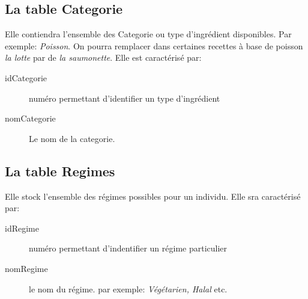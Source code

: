 \subsection{La table Categorie}
Elle contiendra l'ensemble des Categorie ou type d'ingrédient disponibles. Par exemple: \textit{Poisson}. On pourra remplacer dans certaines recettes à base de poisson \textit{la lotte} par de \textit{la saumonette}. Elle est caractérisé par:
\begin{description}
    \item[idCategorie] numéro permettant d'identifier un type d'ingrédient
    \item[nomCategorie] Le nom de la categorie.
\end{description}

\subsection{La table Regimes}
Elle stock l'ensemble des régimes possibles pour un individu. Elle sra caractérisé par:
\begin{description}
    \item[idRegime] numéro permettant d'indentifier un régime particulier
    \item[nomRegime] le nom du régime. par exemple: \textit{Végétarien, Halal} etc.
\end{description}

